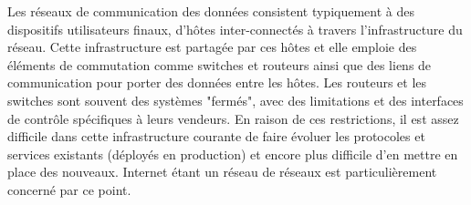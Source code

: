 Les réseaux de communication des données consistent typiquement à des dispositifs utilisateurs finaux, d'hôtes inter-connectés à travers l'infrastructure du réseau. Cette infrastructure est partagée par ces hôtes et elle emploie des éléments de commutation comme switches et routeurs ainsi que des liens de communication pour porter des données entre les hôtes. Les routeurs et les switches sont souvent des systèmes "fermés", avec des limitations et des interfaces de contrôle spécifiques à leurs vendeurs. 
En raison de ces restrictions, il est assez difficile dans cette infrastructure courante de faire évoluer les protocoles et services existants (déployés en production) et encore plus difficile d'en mettre en place des nouveaux.
Internet étant un réseau de réseaux est particulièrement concerné par ce point. \cite{SurveySDNArchi}






